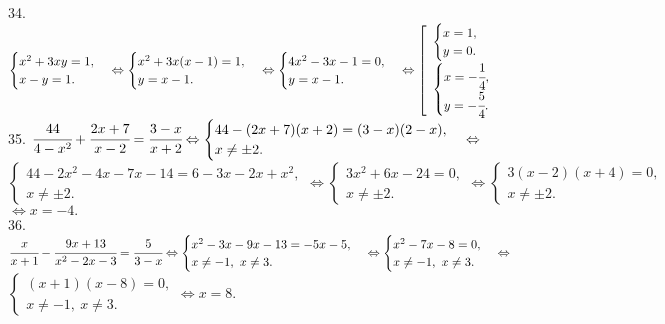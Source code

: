 \documentclass[12pt]{article}
\begin{document}
34. $\begin{cases} x^2+3xy=1,\\ x-y=1.\end{cases}\Leftrightarrow\begin{cases} x^2+3x(x-1)=1,\\ y=x-1.\end{cases}
\Leftrightarrow\begin{cases} 4x^2-3x-1=0,\\ y=x-1.\end{cases}\Leftrightarrow\left[\begin{array}{l}\begin{cases} x=1,\\ y=0.\end{cases}\\ \begin{cases} x=-\cfrac{1}{4},\\ y=-\cfrac{5}{4}.\end{cases}\end{array}\right.$\\
35. $\cfrac{44}{4-x^2}+\cfrac{2x+7}{x-2}=\cfrac{3-x}{x+2}\Leftrightarrow \begin{cases}44-(2x+7)(x+2)=(3-x)(2-x),\\ x\neq\pm2.\end{cases}
\Leftrightarrow$\\$ \begin{cases}44-2x^2-4x-7x-14=6-3x-2x+x^2,\\ x\neq\pm2.\end{cases}
\Leftrightarrow \begin{cases}3x^2+6x-24=0,\\ x\neq\pm2.\end{cases}
\Leftrightarrow \begin{cases}3(x-2)(x+4)=0,\\ x\neq\pm2.\end{cases}$\\$\Leftrightarrow x=-4.$\\
36. $\cfrac{x}{x+1}-\cfrac{9x+13}{x^2-2x-3}=\cfrac{5}{3-x}\Leftrightarrow \begin{cases} x^2-3x-9x-13=-5x-5,\\ x\neq-1,\ x\neq3.\end{cases}
\Leftrightarrow \begin{cases} x^2-7x-8=0,\\ x\neq-1,\ x\neq3.\end{cases}
\Leftrightarrow$\\$\begin{cases} (x+1)(x-8)=0,\\ x\neq-1,\ x\neq3.\end{cases}\Leftrightarrow x=8.$\\
\end{document}
